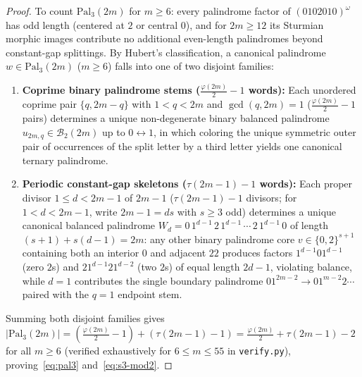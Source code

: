 \documentclass[11pt,a4paper]{article}
\theoremstyle{definition}
\newcommand{\Pal}{\mathrm{Pal}}
\begin{document}
\begin{proof}
To count $\Pal_3(2m)$ for $m \ge 6$: every palindrome factor of $(0102010)^\omega$ has odd length (centered at $2$ or central $0$), and for $2m \ge 12$ its Sturmian morphic images contribute no additional even-length palindromes beyond constant-gap splittings. By Hubert's classification, a canonical palindrome $w \in \Pal_3(2m)$ ($m \ge 6$) falls into one of two disjoint families:
\begin{enumerate}
  \item \textbf{Coprime binary palindrome stems ($\frac{\varphi(2m)}{2} - 1$ words):} Each unordered coprime pair $\{q, 2m - q\}$ with $1 < q < 2m$ and $\gcd(q, 2m) = 1$ ($\frac{\varphi(2m)}{2} - 1$ pairs) determines a unique non-degenerate binary balanced palindrome $u_{2m,q} \in \mathcal{B}_2(2m)$ up to $0 \leftrightarrow 1$, in which coloring the unique symmetric outer pair of occurrences of the split letter by a third letter yields one canonical ternary palindrome.
  \item \textbf{Periodic constant-gap skeletons ($\tau(2m - 1) - 1$ words):} Each proper divisor $1 \le d < 2m - 1$ of $2m - 1$ ($\tau(2m - 1) - 1$ divisors; for $1 < d < 2m - 1$, write $2m - 1 = ds$ with $s \ge 3$ odd) determines a unique canonical balanced palindrome $W_d = 0\, 1^{d-1}\, 2\, 1^{d-1}\, \cdots\, 2\, 1^{d-1}\, 0$ of length $(s + 1) + s(d - 1) = 2m$: any other binary palindrome core $v \in \{0, 2\}^{s+1}$ containing both an interior $0$ and adjacent $22$ produces factors $1^{d-1} 0 1^{d-1}$ (zero $2$s) and $2 1^{d-1} 2 1^{d-2}$ (two $2$s) of equal length $2d - 1$, violating balance, while $d = 1$ contributes the single boundary palindrome $0 1^{2m-2} \to 0 1^{m-2} 2 \cdots$ paired with the $q = 1$ endpoint stem.
\end{enumerate}
Summing both disjoint families gives $|\Pal_3(2m)| = (\frac{\varphi(2m)}{2} - 1) + (\tau(2m - 1) - 1) = \frac{\varphi(2m)}{2} + \tau(2m - 1) - 2$ for all $m \ge 6$ (verified exhaustively for $6 \le m \le 55$ in \texttt{verify.py}), proving~\eqref{eq:pal3} and~\eqref{eq:s3-mod2}.


\end{proof}
\end{document}
